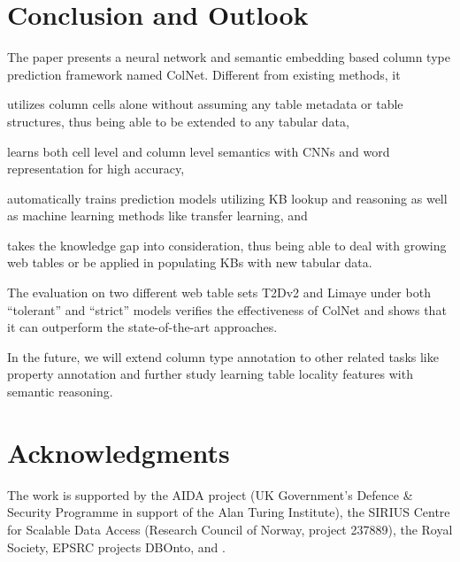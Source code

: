 \documentclass[letterpaper]{article}
\newcommand{\rv}[1]{{\color{black}#1}}
\newcommand{\ColNet}{\textsf{ColNet}\xspace}
\begin{document}
\section{Conclusion and Outlook}
The paper presents a neural network and semantic embedding based column type prediction framework named \ColNet.
Different from existing methods,
it 
\begin{inparaenum}[\it (i)]
\item utilizes column cells alone without assuming any table metadata or table structures, \rv{thus being able to be extended to any tabular data},
\item learns both cell level and column level \rv{semantics with CNNs and word representation for high accuracy}, 
\item automatically trains prediction models utilizing KB lookup and reasoning as well as machine learning methods like transfer learning,
and 
\item  takes the knowledge gap into consideration, \rv{thus being able to deal with growing web tables or be applied in populating KBs with new tabular data.}
\end{inparaenum}
The evaluation on two different web table sets T2Dv2 and Limaye under both ``tolerant'' and ``strict'' models
verifies the effectiveness of \ColNet and shows that it can outperform the \rv{state-of-the-art approaches}.

In the future, \rv{
we will extend column type annotation to other related tasks like property annotation
and further study learning table locality features with semantic reasoning.
}

\section{Acknowledgments}


The work is supported by the AIDA project (UK Government's Defence \& Security Programme in support of the Alan Turing Institute), 
the SIRIUS Centre for Scalable Data Access (Research Council of Norway, project 237889),
the Royal Society,
EPSRC projects DBOnto,  and . 




\end{document}

